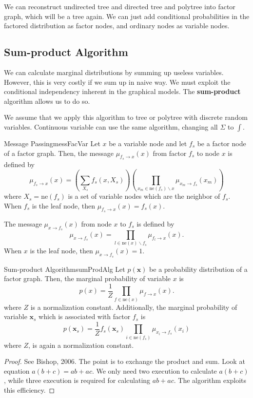 \documentclass{article}
\begin{document}
        We can reconstruct undirected tree and directed tree and polytree into factor graph, which will be a tree again.
        We can just add conditional probabilities in the factored distribution as factor nodes,
        and ordinary nodes as variable nodes.


    \subsection{Sum-product Algorithm}
        We can calculate marginal distributions by summing up useless variables. However, this is very costly if we
        sum up in naive way. We must exploit the conditional independency inherent in the graphical models.
        The \textbf{sum-product} algorithm allows us to do so.

        We assume that we apply this algorithm to tree or polytree with discrete random variables.
        Continuous variable can use the same algorithm, changing all $\Sigma$ to $\int$.
        \begin{defn}{Message Passing}{messFacVar}
            Let $x$ be a variable node and let $f_s$ be a factor node of a factor graph.
            Then, the message $\mu_{f_s \to x}(x)$ from factor $f_s$ to node $x$ is defined by
            \[
            \mu_{f_s \to x}(x)=\left(\sum_{X_s} f_s(x, X_s)\right) \left(\prod_{x_m \in \text{ne}(f_s) \backslash x}\mu_{x_m \to f_s}(x_m)\right)
            \]
            where $X_s=\text{ne}(f_s)$ is a set of variable nodes which are the neighbor of $f_s$.
            When $f_s$ is the leaf node, then $\mu_{f_s \to x}(x) = f_s(x)$.
            
            The message $\mu_{x \to f_s}(x)$ from node $x$ to $f_s$ is defined by
            \[
            \mu_{x \to f_s}(x)=\prod_{l \in \text{ne}(x) \backslash f_s} \mu_{f_l \to x}(x).
            \]
            When $x$ is the leaf node, then $\mu_{x \to f_s}(x) = 1$.
        \end{defn}

        \begin{thm}{Sum-product Algorithm}{sumProdAlg}
            Let $p(\textbf{x})$ be a probability distribution of a factor graph.
            Then, the marginal probability of variable $x$ is
            \[
            p(x) = \frac{1}{Z}\prod_{f \in \text{ne}(x)}\mu_{f \to x}(x).
            \]
            where $Z$ is a normalization constant.
            Additionally, the marginal probability of variable $\textbf{x}_s$ which is
            associated with factor $f_s$ is
            \[
            p(\textbf{x}_s) = \frac{1}{Z}f_s(\textbf{x}_s) \prod_{i \in \text{ne}(f_s)}\mu_{x_i \to f_s}(x_i)
            \]
            where $Z$, is again a normalization constant.
        \end{thm}
        \begin{proof}
            See Bishop, 2006. The point is to exchange the product and sum. Look at equation $a(b+c) = ab+ac$.
            We only need two execution to calculate $a(b+c)$, while three execution is required for calculating $ab + ac$.
            The algorithm exploits this efficiency.
        \end{proof}
        
\end{document}
